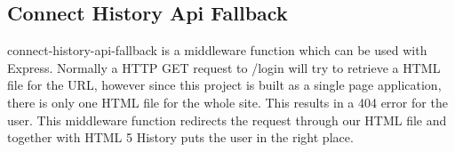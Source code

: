 \subsection{Connect History Api Fallback}
connect-history-api-fallback is a middleware function which can be used with Express. Normally a HTTP GET request to /login will try to retrieve a HTML file for the URL, however since this project is built as a single page application, there is only one HTML file for the whole site. This results in a 404 error for the user. This middleware function redirects the request through our HTML file and together with HTML 5 History puts the user in the right place.